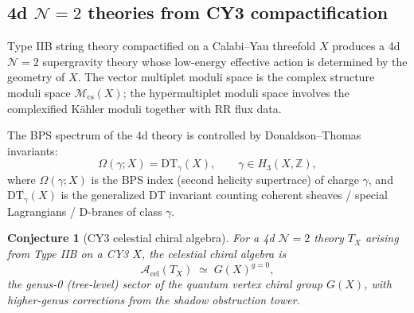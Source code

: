 \documentclass[11pt]{article}
\newtheorem{conjecture}[theorem]{Conjecture}
\theoremstyle{definition}
\theoremstyle{remark}
\newcommand{\cA}{\mathcal{A}}
\newcommand{\cM}{\mathcal{M}}
\newcommand{\DT}{\mathrm{DT}}
\begin{document}
\subsection{4d $\mathcal{N}=2$ theories from CY3 compactification}

Type IIB string theory compactified on a Calabi--Yau threefold $X$
produces a 4d $\mathcal{N}=2$ supergravity theory whose low-energy
effective action is determined by the geometry of $X$. The vector
multiplet moduli space is the complex structure moduli space
$\cM_{\mathrm{cs}}(X)$; the hypermultiplet moduli space involves
the complexified K\"ahler moduli together with RR flux data.

The BPS spectrum of the 4d theory is controlled by
Donaldson--Thomas invariants:
\begin{equation}\label{eq:bps-dt}
\Omega(\gamma; X) = \DT_\gamma(X),
\qquad \gamma \in H_3(X, \mathbb{Z}),
\end{equation}
where $\Omega(\gamma; X)$ is the BPS index (second helicity
supertrace) of charge $\gamma$, and $\DT_\gamma(X)$ is the
generalized DT invariant counting coherent sheaves / special
Lagrangians / D-branes of class $\gamma$.

\begin{conjecture}[CY3 celestial chiral algebra]
\label{conj:cy3-celestial}
For a 4d $\mathcal{N}=2$ theory $T_X$ arising from Type IIB on a
CY3 $X$, the celestial chiral algebra is
\begin{equation}\label{eq:cy3-celestial-identification}
\cA_{\mathrm{cel}}(T_X)
\;\simeq\;
G(X)^{g=0},
\end{equation}
the genus-0 (tree-level) sector of the quantum vertex chiral
group $G(X)$, with higher-genus corrections from the shadow obstruction tower.
\end{conjecture}
\end{document}
